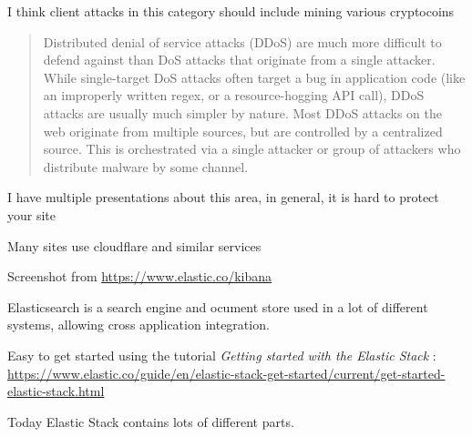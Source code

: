 \documentclass[Screen16to9,17pt]{foils}
\begin{document}
\begin{list2}
\item I think client attacks in this category should include mining various cryptocoins
\end{list2}





\begin{quote}
Distributed denial of service attacks (DDoS) are much more difficult to defend
against than DoS attacks that originate from a single attacker. While single-target DoS
attacks often target a bug in application code (like an improperly written regex, or a
resource-hogging API call), DDoS attacks are usually much simpler by nature.
Most DDoS attacks on the web originate from multiple sources, but are controlled by
a centralized source. This is orchestrated via a single attacker or group of attackers
who distribute malware by some channel.
\end{quote}

\begin{list2}
\item I have multiple presentations about this area, in general, it is hard to protect your site
\item Many sites use cloudflare and similar services
\end{list2}





Screenshot from \url{https://www.elastic.co/kibana}

Elasticsearch is a search engine and ocument store used in a lot of different systems, allowing cross application integration.


Easy to get started using the tutorial \emph{Getting started with the Elastic Stack} :\\
{\footnotesize\url{https://www.elastic.co/guide/en/elastic-stack-get-started/current/get-started-elastic-stack.html}}

Today Elastic Stack contains lots of different parts.
\end{document}
